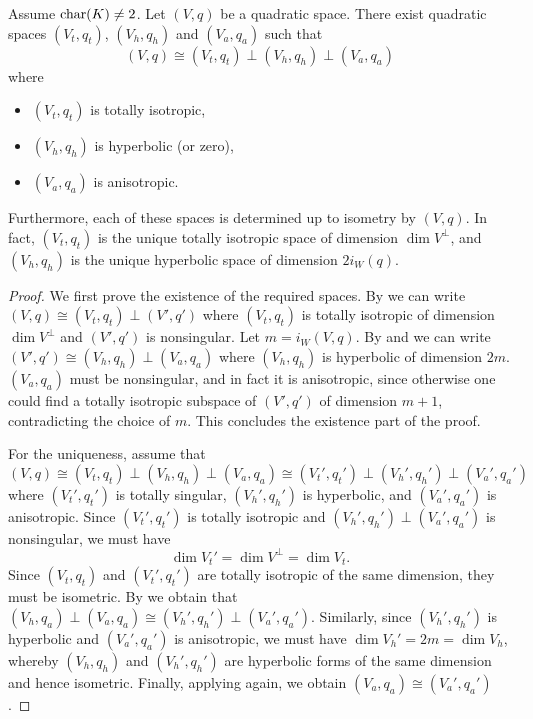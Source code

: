 \documentclass[12pt, leqno, british]{amsart}
\begin{document}
\begin{thm}\label{T:Witt-Decomposition}
Assume $\operatorname{char}(K) \neq 2$.
Let $(V, q)$ be a quadratic space.
There exist quadratic spaces $(V_t, q_t)$, $(V_h, q_h)$ and $(V_a, q_a)$ such that
$$ (V, q) \cong (V_t, q_t) \perp (V_h, q_h) \perp (V_a, q_a)$$ where
\begin{itemize}
\item $(V_t, q_t)$ is totally isotropic,
\item $(V_h, q_h)$ is hyperbolic (or zero),
\item $(V_a, q_a)$ is anisotropic.
\end{itemize}
Furthermore, each of these spaces is determined up to isometry by $(V, q)$.
In fact, $(V_t, q_t)$ is the unique totally isotropic space of dimension $\dim V^\perp$, and $(V_h, q_h)$ is the unique hyperbolic space of dimension $2i_W(q)$.
\end{thm}
\begin{proof}
We first prove the existence of the required spaces.
By  we can write $(V, q) \cong (V_t, q_t) \perp (V', q')$ where $(V_t, q_t)$ is totally isotropic of dimension $\dim V^\perp$ and $(V', q')$ is nonsingular.
Let $m = i_W(V, q)$.
By  and  we can write $(V', q') \cong (V_h, q_h) \perp (V_a, q_a)$ where $(V_h, q_h)$ is hyperbolic of dimension $2m$.
$(V_a, q_a)$ must be nonsingular, and in fact it is anisotropic, since otherwise one could find a totally isotropic subspace of $(V', q')$ of dimension $m+1$, contradicting the choice of $m$.
This concludes the existence part of the proof.

For the uniqueness, assume that
$$ (V, q) \cong (V_t, q_t) \perp (V_h, q_h) \perp (V_a, q_a) \cong (V_t', q_t') \perp (V_h', q_h') \perp (V_a', q_a')$$
where $(V_t', q_t')$ is totally singular, $(V_h', q_h')$ is hyperbolic, and $(V_a', q_a')$ is anisotropic.
Since $(V_t', q_t')$ is totally isotropic and $(V_h', q_h') \perp (V_a', q_a')$ is nonsingular, we must have
$$ \dim V_t' = \dim V^\perp = \dim V_t.$$
Since $(V_t, q_t)$ and $(V_t', q_t')$ are totally isotropic of the same dimension, they must be isometric.
By  we obtain that $(V_h, q_a) \perp (V_a, q_a) \cong (V_h', q_h') \perp (V_a', q_a')$.
Similarly, since $(V_h', q_h')$ is hyperbolic and $(V_a', q_a')$ is anisotropic, we must have $\dim V_h' = 2m = \dim V_h$, whereby $(V_h, q_h)$ and $(V_h', q_h')$ are hyperbolic forms of the same dimension and hence isometric.
Finally, applying  again, we obtain $(V_a, q_a) \cong (V_a', q_a')$.
\end{proof}
\end{document}
